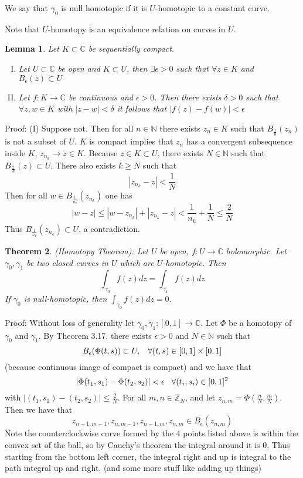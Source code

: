 \documentclass[11pt]{article}
\theoremstyle{plain}
\newtheorem{theorem}{Theorem}[section]
\newtheorem{lemma}[theorem]{Lemma}
\theoremstyle{definition}
\newcommand{\C}{\mathbb{C}}
\begin{document}
We say that $\gamma_0$ is null homotopic if it is $U$-homotopic to a constant curve. 

Note that $U$-homotopy is an equivalence relation on curves in $U$.

\begin{lemma}
Let $K \subset \C$ be sequentially compact. 
\begin{enumerate}[(I)]
\item Let $U \subset \C$ be open and $K \subset U$, then $\exists \epsilon > 0$ such that $\forall z \in K$ and $B_{\epsilon}(z) \subset U$
\item Let $f: K \to \C$ be continuous and $\epsilon > 0$. Then there exists $\delta > 0$ such that $\forall z,w \in K$ with $|z - w| < \delta$ it follows that $|f(z) - f(w)| < \epsilon$
\end{enumerate}
\end{lemma}

Proof: (I) Suppose not. Then for all $n \in \mathbb{N}$ there exists $z_n \in K$ such that $B_{\frac{1}{n}}(z_n)$ is not a subset of $U$. $K$ is compact implies that $z_n$ has a convergent subsequence inside $K$, $z_{n_k} \to z \in K$. Because $z \in K \subset U$, there exists $N \in \mathbb{N}$ such that $B_{\frac{2}{N}}(z) \subset U$. There also exists $k \geq N$ such that 
$$ |z_{n_k} - z| < \frac{1}{N} $$
Then for all $w \in B_{\frac{1}{n_k}} (z_{n_k})$ one has 
$$ |w -z | \leq |w - z_{n_k}| + |z_{n_k} - z| < \frac{1}{n_k} + \frac{1}{N} \leq \frac{2}{N} $$ 
Thus $B_{\frac{1}{n_k}}(z_{n_k}) \subset U$, a contradiction.

\begin{theorem}
(Homotopy Theorem): Let $U$ be open, $f: U \to \C$ holomorphic. Let $\gamma_0, \gamma_1$ be two closed curves in $U$ which are $U$-homotopic. Then
$$ \int_{\gamma_0} f(z)dz = \int_{\gamma_1} f(z)dz $$
If $\gamma_0$ is null-homotopic, then $\int_{\gamma_0}f(z)dz = 0$. 
\end{theorem}

Proof: Without loss of generality let $\gamma_0, \gamma_1 : [0,1] \to \C$. Let $\Phi$ be a homotopy of $\gamma_0$ and $\gamma_1$. By Theorem 3.17, there exists $\epsilon > 0$ and $N \in \mathbb{N}$ such that 
$$ B_{\epsilon}(\Phi(t, s)) \subset U, \hspace{3mm} \forall (t,s) \in [0,1] \times [0,1] $$ 
(because continuous image of compact is compact) and we have that 
$$ |\Phi(t_1, s_1) - \Phi(t_2, s_2)| < \epsilon \hspace{3mm} \forall (t_i, s_i) \in [0,1]^2 $$
with $|(t_1, s_1) - (t_2, s_2)| \leq \frac{2}{N}$. For all $m,n \in \mathbb{Z}_N$, and let $z_{n,m} = \Phi(\frac{n}{N}, \frac{m}{N})$. Then we have that 
$$z_{n-1, m-1}, z_{n,m-1}, z_{n-1,m}, z_{n,m} \in B_{\epsilon}(z_{n,m})$$
Note the counterclockwise curve formed by the 4 points listed above is within the convex set of the ball, so by Cauchy's theorem the integral around it is $0$. Thus starting from the bottom left corner, the integral right and up is integral to the path integral up and right. (and some more stuff like adding up things)
\end{document}
